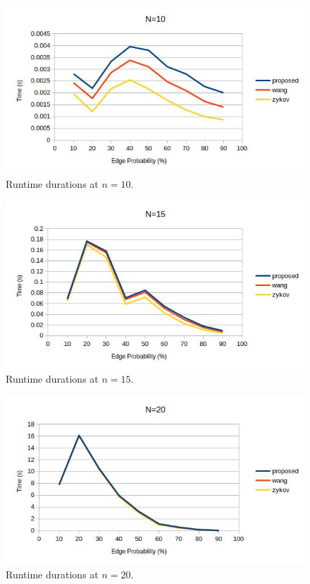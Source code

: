 \begin{figure}[H]
  \centering
  \includegraphics[width=5in]{duration_10}
  \caption{Runtime durations at \(n=10\).}
  \label{fig:duration10}
\end{figure}

\begin{figure}[H]
  \centering
  \includegraphics[width=5in]{duration_15}
  \caption{Runtime durations at \(n=15\).}
  \label{fig:duration15}
\end{figure}

\begin{figure}[H]
  \centering
  \includegraphics[width=5in]{duration_20}
  \caption{Runtime durations at \(n=20\).}
  \label{fig:duration20}
\end{figure}

